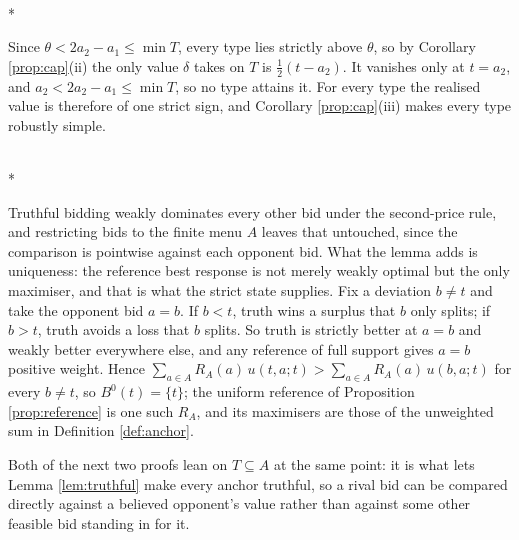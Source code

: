 \documentclass[12pt]{article}
\makeatletter
\theoremstyle{definition}
\renewenvironment{proof}[1][\proofname]{\par
  \pushQED{\qed}%
  \normalfont \topsep6\p@\@plus6\p@\relax
  \trivlist
  \item[\hskip\labelsep\itshape #1\@addpunct{.}]\mbox{}\\*
  \ignorespaces
}{%
  \popQED\endtrivlist\@endpefalse
}
\makeatother
\begin{document}
\begin{proof}[Proof of Corollary \ref{cor:floor}]
Since $\theta < 2a_2 - a_1 \le \min T$, every type lies strictly above $\theta$, so by Corollary \ref{prop:cap}(ii) the only value $\delta$ takes on $T$ is $\tfrac12 (t - a_2)$. It vanishes only at $t = a_2$, and $a_2 < 2a_2 - a_1 \le \min T$, so no type attains it. For every type the realised value is therefore of one strict sign, and Corollary \ref{prop:cap}(iii) makes every type robustly simple.
\end{proof}

\begin{proof}[Proof of Lemma \ref{lem:truthful}]
Truthful bidding weakly dominates every other bid under the second-price rule, and restricting bids to the finite menu $A$ leaves that untouched, since the comparison is pointwise against each opponent bid. What the lemma adds is uniqueness: the reference best response is not merely weakly optimal but the only maximiser, and that is what the strict state supplies. Fix a deviation $b \neq t$ and take the opponent bid $a = b$. If $b < t$, truth wins a surplus that $b$ only splits; if $b > t$, truth avoids a loss that $b$ splits. So truth is strictly better at $a = b$ and weakly better everywhere else, and any reference of full support gives $a = b$ positive weight. Hence $\sum_{a \in A} R_A(a)\, u(t, a; t) > \sum_{a \in A} R_A(a)\, u(b, a; t)$ for every $b \neq t$, so $B^0(t) = \{t\}$; the uniform reference of Proposition \ref{prop:reference} is one such $R_A$, and its maximisers are those of the unweighted sum in Definition \ref{def:anchor}.
\end{proof}

Both of the next two proofs lean on $T \subseteq A$ at the same point: it is what lets Lemma \ref{lem:truthful} make every anchor truthful, so a rival bid can be compared directly against a believed opponent's value rather than against some other feasible bid standing in for it.
\end{document}
